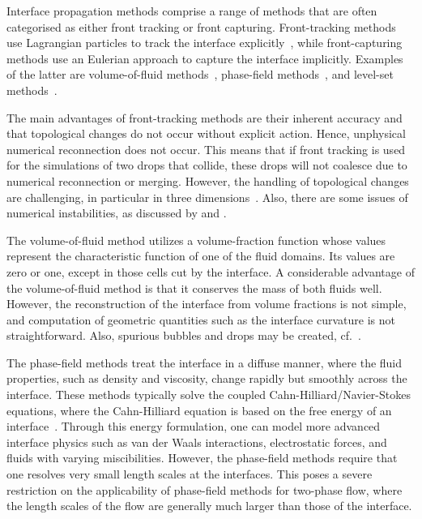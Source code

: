 \documentclass[11pt,b5paper,DIV=calc,BCOR1.3cm,headings=small,%
               footinclude=false,headsepline]{scrbook}
\begin{document}
Interface propagation methods comprise a range of methods that are often
categorised as either front tracking or front capturing.  Front-tracking
methods use Lagrangian particles to track the interface
explicitly~\cite{Tryggvason01}, while front-capturing methods use an Eulerian
approach to capture the interface implicitly.  Examples of the latter are
volume-of-fluid methods~\cite{Scardovelli99,Tryggvason11}, phase-field
methods~\cite{Anderson98,Jacqmin99,Lowengrub98}, and level-set
methods~\cite{Osher03}.

The main advantages of front-tracking methods are their inherent accuracy and
that topological changes do not occur without explicit action.  Hence,
unphysical numerical reconnection does not occur.  This means that if front
tracking is used for the simulations of two drops that collide, these drops
will not coalesce due to numerical reconnection or merging.  However, the
handling of topological changes are challenging, in particular in three
dimensions~\cite{Shin02}.  Also, there are some issues of numerical
instabilities, as discussed by \citet{Sethian85} and \citet{Osher88}.

The volume-of-fluid method utilizes a volume-fraction function whose values
represent the characteristic function of one of the fluid domains.  Its values
are zero or one, except in those cells cut by the interface.  A considerable
advantage of the volume-of-fluid method is that it conserves the mass of both
fluids well.  However, the reconstruction of the interface from volume
fractions is not simple, and computation of geometric quantities such as the
interface curvature is not straightforward.  Also, spurious bubbles and drops
may be created, cf.\ \cite{Lafaurie94}.

The phase-field methods treat the interface in a diffuse manner, where the
fluid properties, such as density and viscosity, change rapidly but smoothly
across the interface.  These methods typically solve the coupled
Cahn-Hilliard/Navier-Stokes equations, where the Cahn-Hilliard equation is
based on the free energy of an interface~\cite{Cahn57}.  Through this energy
formulation, one can model more advanced interface physics such as van der
Waals interactions, electrostatic forces, and fluids with varying
miscibilities.  However, the phase-field methods require that one resolves very
small length scales at the interfaces.  This poses a severe restriction on the
applicability of phase-field methods for two-phase flow, where the length
scales of the flow are generally much larger than those of the interface.
\end{document}
